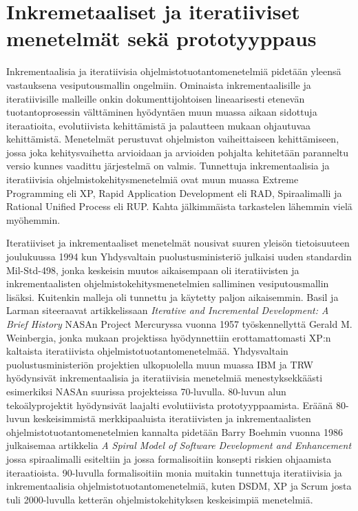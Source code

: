 \documentclass[finnish,12pt]{tktltiki2}
\theoremstyle{definition}
\theoremstyle{remark}
\begin{document}
\section{Inkremetaaliset ja iteratiiviset menetelmät sekä prototyyppaus}

Inkrementaalisia ja iteratiivisia ohjelmistotuotantomenetelmiä pidetään yleensä vastauksena vesiputousmallin ongelmiin. Ominaista inkrementaalisille ja iteratiivisille malleille onkin dokumenttijohtoisen lineaarisesti etenevän tuotantoprosessin välttäminen hyödyntäen muun muassa aikaan sidottuja iteraatioita, evolutiivista kehittämistä ja palautteen mukaan ohjautuvaa kehittämistä. \cite{larman03} Menetelmät perustuvat ohjelmiston vaiheittaiseen kehittämiseen, jossa joka kehitysvaihetta arvioidaan ja arvioiden pohjalta kehitetään paranneltu versio kunnes vaadittu järjestelmä on valmis. \cite{Sommerville10}
Tunnettuja inkrementaalisia ja iteratiivisia ohjelmistokehitysmenetelmiä ovat muun muassa Extreme Programming eli XP, Rapid Application Development eli RAD, Spiraalimalli ja Rational Unified Process eli RUP. Kahta jälkimmäista tarkastelen lähemmin vielä myöhemmin.

Iteratiiviset ja inkrementaaliset menetelmät nousivat suuren yleisön tietoisuuteen joulukuussa 1994 kun Yhdysvaltain puolustusministeriö julkaisi uuden standardin Mil-Std-498, jonka keskeisin muutos aikaisempaan oli iteratiivisten ja inkrementaalisten ohjelmistokehitysmenetelmien salliminen vesiputousmallin lisäksi. Kuitenkin malleja oli tunnettu ja käytetty paljon aikaisemmin. Basil ja Larman siteeraavat artikkelissaan \textit{Iterative and Incremental Development: A Brief History} NASAn Project Mercuryssa vuonna 1957 työskennellyttä Gerald M. Weinbergia, jonka mukaan projektissa hyödynnettiin erottamattomasti XP:n kaltaista iteratiivista ohjelmistotuotantomenetelmää. Yhdysvaltain puolustusministeriön projektien ulkopuolella muun muassa IBM ja TRW hyödynsivät inkrementaalisia ja iteratiivisia menetelmiä menestyksekkäästi esimerkiksi NASAn suurissa projekteissa 70-luvulla.\cite{larman03} 80-luvun alun tekoälyprojektit hyödynsivät laajalti evolutiivista prototyyppaamista. Eräänä 80-luvun keskeisimmistä merkkipaaluista iteratiivisten ja inkrementaalisten ohjelmistotuotantomenetelmien kannalta pidetään Barry Boehmin vuonna 1986 julkaisemaa artikkelia \textit{A Spiral Model of Software Development and Enhancement} jossa spiraalimalli esiteltiin ja jossa formalisoitiin konsepti riskien ohjaamista iteraatioista. 
90-luvulla formalisoitiin monia muitakin tunnettuja iteratiivisia ja inkrementaalisia ohjelmistotuotantomenetelmiä, kuten DSDM, XP ja Scrum josta tuli 2000-luvulla ketterän ohjelmistokehityksen keskeisimpiä menetelmiä.
\end{document}
